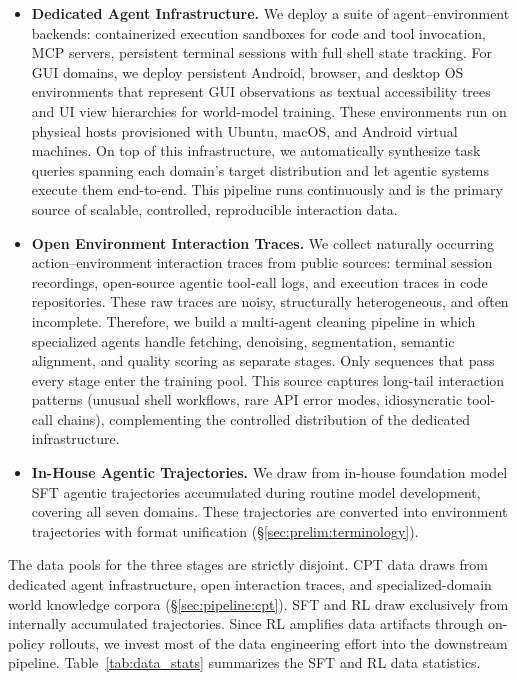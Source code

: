 \documentclass{llmxive}
\begin{document}
\begin{itemize}[leftmargin=1.5em,itemsep=2pt]
\item \textbf{Dedicated Agent Infrastructure.}
We deploy a suite of agent--environment backends: containerized execution sandboxes for code and tool invocation, MCP servers, persistent terminal sessions with full shell state tracking.
For GUI domains, we deploy persistent Android, browser, and desktop OS environments that represent GUI observations as textual accessibility trees and UI view hierarchies for world-model training. These environments run on physical hosts provisioned with Ubuntu, macOS, and Android virtual machines.
On top of this infrastructure, we automatically synthesize task queries spanning each domain's target distribution and let agentic systems execute them end-to-end.
This pipeline runs continuously and is the primary source of scalable, controlled, reproducible interaction data.

\item \textbf{Open Environment Interaction Traces.}
We collect naturally occurring action--environment interaction traces from public sources:
terminal session recordings,
open-source agentic tool-call logs, and execution traces in code repositories.
These raw traces are noisy, structurally heterogeneous, and often incomplete.
Therefore, we build a multi-agent cleaning pipeline in which specialized agents handle fetching, denoising, segmentation, semantic alignment, and quality scoring as separate stages.
Only sequences that pass every stage enter the training pool.
This source captures long-tail interaction patterns (unusual shell workflows, rare API error modes, idiosyncratic tool-call chains), complementing the controlled distribution of the dedicated infrastructure.

\item \textbf{In-House Agentic Trajectories.}
We draw from in-house foundation model SFT agentic trajectories accumulated during routine model development, covering all seven domains.
These trajectories are converted into environment trajectories with format unification (\S\ref{sec:prelim:terminology}).
\end{itemize}

The data pools for the three stages are strictly disjoint.
CPT data draws from dedicated agent infrastructure, open interaction traces, and specialized-domain world knowledge corpora (\S\ref{sec:pipeline:cpt}).
SFT and RL draw exclusively from internally accumulated trajectories.
Since RL amplifies data artifacts through on-policy rollouts, we invest most of the data engineering effort into the downstream pipeline.
Table~\ref{tab:data_stats} summarizes the SFT and RL data statistics.
\end{document}
